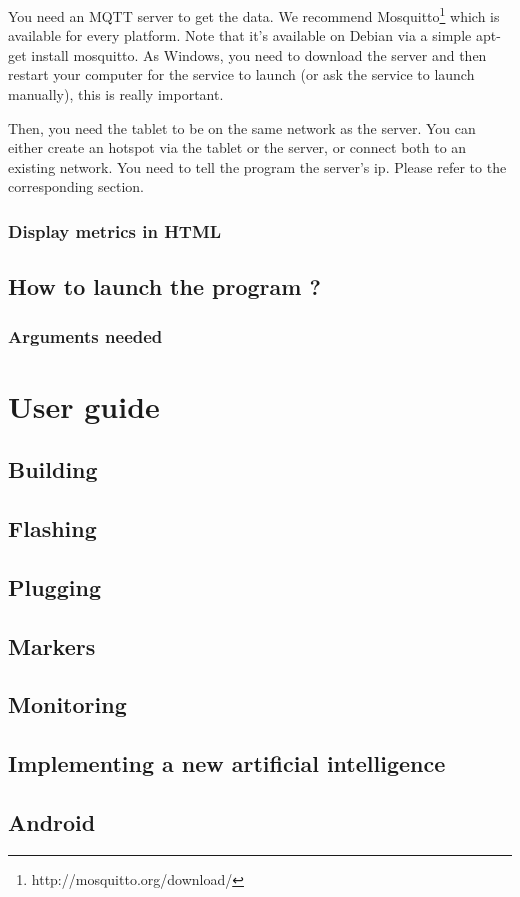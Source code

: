 \documentclass[a4paper,11pt]{report}
\begin{document}
You need an MQTT server to get the data. We recommend
Mosquitto\footnote{http://mosquitto.org/download/} which is available for every
platform.  Note that it's available on Debian via a simple apt-get install
mosquitto. As Windows, you need to download the server and then restart your
computer for the service to launch (or ask the service to launch manually),
this is really important.

Then, you need the tablet to be on the same network as the server. You can
either create an hotspot via the tablet or the server, or connect both to an
existing network.  You need to tell the program the server's ip. Please refer
to the corresponding section.

\subsection{Display metrics in HTML}

\section{How to launch the program ?}

\subsection{Arguments needed}







\chapter{User guide}

\section{Building}

\section{Flashing}

\section{Plugging}

\section{Markers}

\section{Monitoring}

\section{Implementing a new artificial intelligence}

\section{Android}
\end{document}
